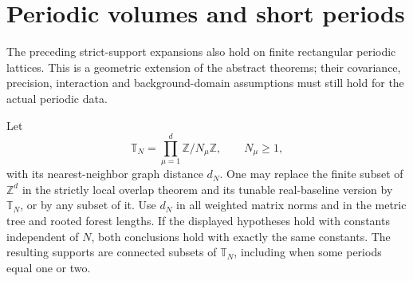 
\section{Periodic volumes and short periods}
\label{op-section}

The preceding strict-support expansions also hold on finite rectangular
periodic lattices. This is a geometric extension of the abstract theorems;
their covariance, precision, interaction and background-domain assumptions
must still hold for the actual periodic data.

\begin{proposition}
\label{op-periodic-theorem}
Let
\[
 \mathbb T_N=\prod_{\mu=1}^{d}\mathbb Z/N_\mu\mathbb Z,
 \qquad N_\mu\ge1,
\]
with its nearest-neighbor graph distance $d_N$. One may replace the finite
subset of $\mathbb Z^d$ in the strictly local overlap theorem and its
tunable real-baseline version by $\mathbb T_N$, or by any subset of it.
Use $d_N$ in all weighted matrix norms and in the metric tree and rooted
forest lengths. If the displayed hypotheses hold with constants independent
of $N$, both conclusions hold with exactly the same constants. The resulting
supports are connected subsets of $\mathbb T_N$, including when some
periods equal one or two.
\end{proposition}

